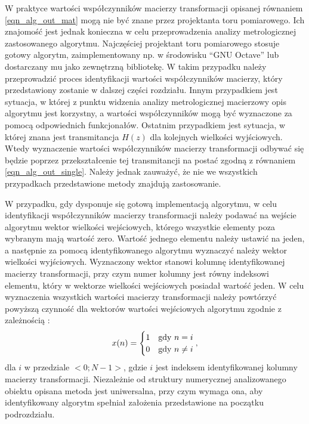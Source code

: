 W praktyce wartości współczynników macierzy transformacji opisanej równaniem \eqref{eqn_alg_out_mat} mogą nie być znane przez projektanta toru pomiarowego. Ich znajomość jest jednak konieczna w celu przeprowadzenia analizy metrologicznej zastosowanego algorytmu. Najczęściej projektant toru pomiarowego stosuje gotowy algorytm, zaimplementowany np. w środowisku \enquote{GNU Octave} lub dostarczany mu jako zewnętrzną bibliotekę. W takim przypadku należy przeprowadzić proces identyfikacji wartości współczynników macierzy, który przedstawiony zostanie w dalszej części rozdziału. Innym przypadkiem jest sytuacja, w której z punktu widzenia analizy metrologicznej macierzowy opis algorytmu jest korzystny, a wartości współczynników mogą być wyznaczone za pomocą odpowiednich funkcjonałów. Ostatnim przypadkiem jest sytuacja, w której znana jest transmitancja $H(z)$ dla kolejnych wielkości wyjściowych. Wtedy wyznaczenie wartości współczynników macierzy transformacji odbywać się będzie poprzez przekształcenie tej transmitancji na postać zgodną z równaniem \eqref{eqn_alg_out_single}. Należy jednak zauważyć, że nie we wszystkich przypadkach przedstawione metody znajdują zastosowanie.

W przypadku, gdy dysponuje się gotową implementacją algorytmu, w celu identyfikacji współczynników macierzy transformacji należy podawać na wejście algorytmu wektor wielkości wejściowych, którego wszystkie elementy poza wybranym mają wartość zero. Wartość jednego elementu należy ustawić na jeden, a następnie za pomocą identyfikowanego algorytmu wyznaczyć należy wektor wielkości wyjściowych. Wyznaczony wektor stanowi kolumnę identyfikowanej macierzy transformacji, przy czym numer kolumny jest równy indeksowi elementu, który w wektorze wielkości wejściowych posiadał wartość jeden. W celu wyznaczenia wszystkich wartości macierzy transformacji należy powtórzyć powyższą czynność dla wektorów wartości wejściowych algorytmu zgodnie z zależnością \cite{jakubiec_algorithms}:
\begin{equation}
x(n) =
\begin{cases}
	1 & $gdy$ ~ n = i \\
	0 & $gdy$ ~ n \neq i
\end{cases}
\label{eqn_wt_ident},
\end{equation}
dla $i$ w przedziale $<0;N-1>$, gdzie $i$ jest indeksem identyfikowanej kolumny macierzy transformacji. Niezależnie od struktury numerycznej analizowanego obiektu opisana metoda jest uniwersalna, przy czym wymaga ona, aby identyfikowany algorytm spełniał założenia przedstawione na początku podrozdziału.

